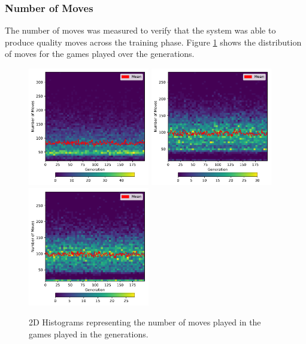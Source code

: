 \documentclass[12pt,a4paper]{article}
\begin{document}
        \subsubsection{Number of Moves}
            The number of moves was measured to verify that the system was able to produce quality moves across the training phase. Figure \ref{move_chart} shows the distribution of moves for the games played over the generations.

            \begin{figure}[!ht]
                \centering
                \includegraphics[width=53mm]{images/results/1ply/moves.pdf}
                \includegraphics[width=53mm]{images/results/3ply/moves.pdf}
                \includegraphics[width=53mm]{images/results/6ply/moves.pdf}
                \caption{2D Histograms representing the number of moves played in the games played in the generations. \label{move_chart}}
            \end{figure}
\end{document}

